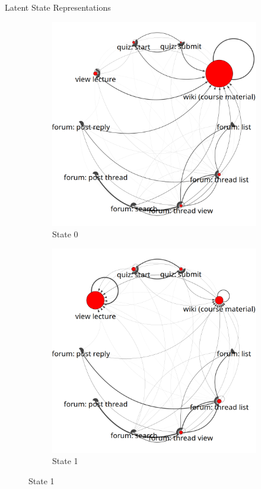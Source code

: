 \documentclass[final,t]{beamer}
\begin{document}
\begin{frame}[fragile]
\begin{columns}[t]
\begin{column}{0.3\textwidth}
      \begin{block}{Latent State Representations}
        \begin{figure}
          \centering
          \begin{subfigure}[t]{0.9\textwidth}
            \includegraphics[width=\textwidth]{../../figures/text-4state/state0.png}
            \caption{\label{fig:state0}State 0}
          \end{subfigure}

          \begin{subfigure}[t]{0.9\textwidth}
            \includegraphics[width=\textwidth]{../../figures/text-4state/state1.png}
            \caption{\label{fig:state1}State 1}
          \end{subfigure}


\end{figure}
\end{block}
\end{column}
\end{columns}
\end{frame}
\end{document}
